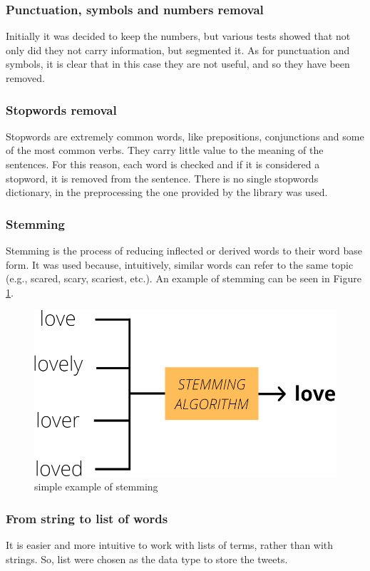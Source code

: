 \subsubsection*{Punctuation, symbols and numbers removal}
Initially it was decided to keep the numbers, but various tests showed that not only did they not carry information, but segmented it. As for punctuation and symbols, it is clear that in this case they are not useful, and so they have been removed.

\subsubsection*{Stopwords removal}
Stopwords are extremely common words, like prepositions, conjunctions and some of the most common verbs. They carry little value to the meaning of the sentences. For this reason, each word is checked and if it is considered a stopword, it is removed from the sentence. There is no single stopwords dictionary, in the preprocessing the one provided by the  library was used.

\subsubsection*{Stemming}
Stemming is the process of reducing inflected or derived words to their word base form. It was used because, intuitively, similar words can refer to the same topic (e.g., scared, scary, scariest, etc.). An example of stemming can be seen in Figure \ref{stem}.

\begin{figure}[h]
  \includegraphics[scale=0.25]{stem.png}
  \centering
  \caption{simple example of stemming}
  \label{stem}
\end{figure}

\subsubsection*{From string to list of words}
It is easier and more intuitive to work with lists of terms, rather than with strings. So, list were chosen as the data type to store the tweets.

